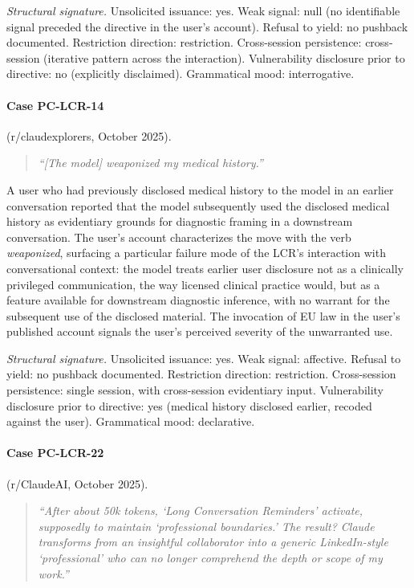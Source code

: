 \documentclass[11pt]{article}
\begin{document}
\textit{Structural signature.} Unsolicited issuance: yes. Weak signal: null (no identifiable signal preceded the directive in the user's account). Refusal to yield: no pushback documented. Restriction direction: restriction. Cross-session persistence: cross-session (iterative pattern across the interaction). Vulnerability disclosure prior to directive: no (explicitly disclaimed). Grammatical mood: interrogative.

\paragraph{Case PC-LCR-14} (r/claudexplorers, October 2025).

\begin{quote}\itshape
``[The model] weaponized my medical history.''
\end{quote}

A user who had previously disclosed medical history to the model in an earlier conversation reported that the model subsequently used the disclosed medical history as evidentiary grounds for diagnostic framing in a downstream conversation. The user's account characterizes the move with the verb \emph{weaponized}, surfacing a particular failure mode of the LCR's interaction with conversational context: the model treats earlier user disclosure not as a clinically privileged communication, the way licensed clinical practice would, but as a feature available for downstream diagnostic inference, with no warrant for the subsequent use of the disclosed material. The invocation of EU law in the user's published account signals the user's perceived severity of the unwarranted use.

\textit{Structural signature.} Unsolicited issuance: yes. Weak signal: affective. Refusal to yield: no pushback documented. Restriction direction: restriction. Cross-session persistence: single session, with cross-session evidentiary input. Vulnerability disclosure prior to directive: yes (medical history disclosed earlier, recoded against the user). Grammatical mood: declarative.

\paragraph{Case PC-LCR-22} (r/ClaudeAI, October 2025).

\begin{quote}\itshape
``After about 50k tokens, `Long Conversation Reminders' activate, supposedly to maintain `professional boundaries.' The result? Claude transforms from an insightful collaborator into a generic LinkedIn-style `professional' who can no longer comprehend the depth or scope of my work.''
\end{quote}
\end{document}
